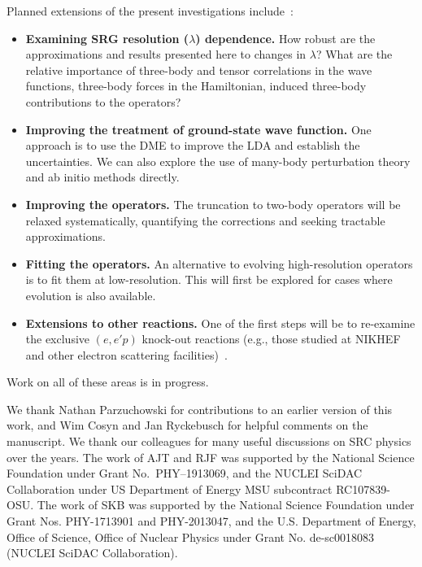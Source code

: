 \documentclass[10pt,aps,prc,floatfix,twocolumn,nofootinbib]{revtex4-1}
\begin{document}
Planned extensions of the present investigations include~\cite{Tropiano:2021prep}:
\begin{itemize}
    \item \textbf{Examining SRG resolution ($\lambda$) dependence.} How robust are the approximations and results presented here to changes in $\lambda$? What are the relative importance of three-body and tensor correlations in the wave functions, three-body forces in the Hamiltonian, induced three-body contributions to the operators?
        
    \item \textbf{Improving the treatment of ground-state wave function.} 
    One approach is to use the DME to improve the LDA and establish the uncertainties. 
    We can also explore the use of many-body perturbation theory and ab initio methods directly.
        
    \item \textbf{Improving the operators.} The truncation to two-body operators will be relaxed systematically, quantifying the corrections and seeking tractable approximations.
        
    \item \textbf{Fitting the operators.}
    An alternative to evolving high-resolution operators is to fit them at low-resolution. 
    This will first be explored for cases where evolution is also available.
        
    \item \textbf{Extensions to other reactions.}
    One of the first steps will be to re-examine the exclusive $(e,e'p)$ knock-out reactions (e.g., those studied at NIKHEF and other electron scattering facilities)~\cite{Dieperink:1990uk,Kelly:1996hd}.
        
\end{itemize}
%
Work on all of these areas is in progress.
    



\begin{acknowledgments}
We thank Nathan Parzuchowski for contributions to an earlier version of this work, and Wim Cosyn and Jan Ryckebusch for helpful comments on the manuscript. We thank our colleagues for many useful discussions on SRC physics over the years.
The work of AJT and RJF was supported by the National Science Foundation under Grant No.~PHY--1913069, and the NUCLEI SciDAC Collaboration under US Department of Energy MSU subcontract RC107839-OSU\@.
The work of SKB was supported by the National Science Foundation under Grant Nos. PHY-1713901 and PHY-2013047, and the U.S. Department of Energy, Office of Science, Office of Nuclear Physics under Grant No. de-sc0018083 (NUCLEI SciDAC Collaboration).
\end{acknowledgments}
\end{document}
